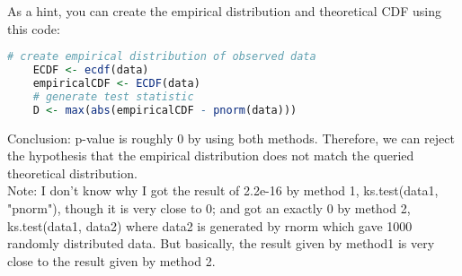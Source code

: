 \documentclass[12pt,letterpaper]{article}
\begin{document}
	
\noindent As a hint, you can create the empirical distribution and theoretical CDF using this code:

\begin{lstlisting}[language=R]
	# create empirical distribution of observed data
	ECDF <- ecdf(data)
	empiricalCDF <- ECDF(data)
	# generate test statistic
	D <- max(abs(empiricalCDF - pnorm(data))) \end{lstlisting}

	
	
	Conclusion: p-value is roughly 0 by using both methods. Therefore, we can reject the hypothesis that the empirical distribution does not match the queried theoretical distribution.\\
	Note: I don't know why I got the result of 2.2e-16 by method 1, ks.test(data1, "pnorm"), though it is very close to 0; and got an exactly 0 by method 2, ks.test(data1, data2) where data2 is generated by rnorm which gave 1000 randomly distributed data. But basically, the result given by  method1 is very close to the result given by method 2.  
	
	

\vspace{3in}
\end{document}
